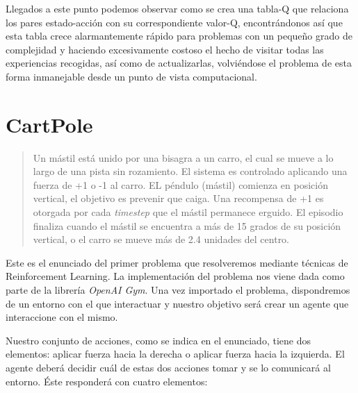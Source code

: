 Llegados a este punto podemos observar como se crea una tabla-Q que relaciona los pares estado-acción con su correspondiente valor-Q, encontrándonos así que esta tabla crece alarmantemente rápido para problemas con un pequeño grado de complejidad y haciendo excesivamente costoso el hecho de visitar todas las experiencias recogidas, así como de actualizarlas, volviéndose el problema de esta forma inmanejable desde un punto de vista computacional.

\section{CartPole}
\begin{quote}
    Un mástil está unido por una bisagra a un carro, el cual se mueve a lo largo de una pista sin rozamiento. El sistema es controlado aplicando una fuerza de +1 o -1 al carro. EL péndulo (mástil) comienza en posición vertical, el objetivo es prevenir que caiga. Una recompensa de +1 es otorgada por cada \textit{timestep} que el mástil permanece erguido. El episodio finaliza cuando el mástil se encuentra a más de 15 grados de su posición vertical, o el carro se mueve más de 2.4 unidades del centro.
\end{quote}

Este es el enunciado del primer problema que resolveremos mediante técnicas de Reinforcement Learning. La implementación del problema nos viene dada como parte de la librería \textit{OpenAI Gym}. Una vez importado el problema, dispondremos de un entorno con el que interactuar y nuestro objetivo será crear un agente que interaccione con el mismo.

Nuestro conjunto de acciones, como se indica en el enunciado, tiene dos elementos: aplicar fuerza hacia la derecha o aplicar fuerza hacia la izquierda. El agente deberá decidir cuál de estas dos acciones tomar y se lo comunicará al entorno. Éste responderá con cuatro elementos:

